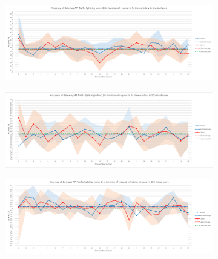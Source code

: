 \begin{figure}[H]
    \centering
    \begin{subfigure}[b]{0.8\textwidth}
        \includegraphics[width=\textwidth]{plots/traffic-splitting/time_window_5_1vu_cloud.png}
        \label{fig:time_window_1vu}
    \end{subfigure}

    \vspace{-0.1cm} %

    \begin{subfigure}[b]{0.8\textwidth}
        \includegraphics[width=\textwidth]{plots/traffic-splitting/time_window_5_10vu_cloud.png}
        \label{fig:time_window_10vu}
    \end{subfigure}

    \vspace{-0.1cm} %

    \begin{subfigure}[b]{0.8\textwidth}
        \includegraphics[width=\textwidth]{plots/traffic-splitting/time_window_5_100vu_cloud.png}
        \label{fig:time_window_100vu}
    \end{subfigure}


\end{figure}

